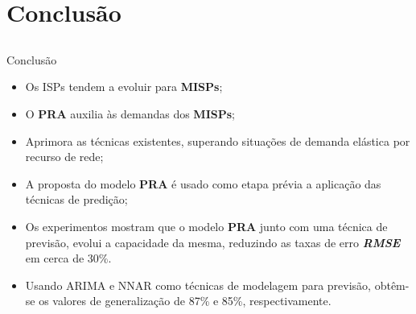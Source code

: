 \documentclass[aspectratio=169]{beamer}
\begin{document}





\section{Conclusão}


\subsection{}
\begin{frame}
\frametitle{}
\small
\begin{block}{Conclusão}
\begin{itemize} \small
\item Os ISPs tendem a evoluir para \textbf{MISPs};
\item O \textbf{PRA} auxilia às demandas dos \textbf{MISPs};
\item Aprimora as técnicas existentes, superando situações de demanda elástica por recurso de rede;
\item A proposta do modelo \textbf{PRA} é usado como etapa prévia a aplicação das técnicas de predição;
\item Os experimentos mostram que o modelo \textbf{PRA} junto com uma técnica de previsão, evolui a capacidade da mesma, reduzindo as taxas de erro \textit{\textbf{RMSE}} em cerca de 30\%.
\item Usando ARIMA e NNAR como técnicas de modelagem para previsão, obtêm-se os
valores de generalização de 87\% e 85\%, respectivamente.
\end{itemize}
\end{block}

\end{frame}
\end{document}
